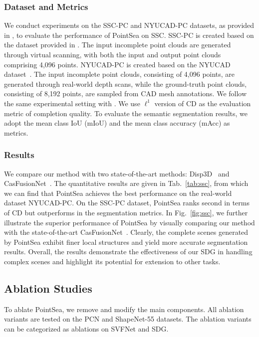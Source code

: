 \subsubsection{Dataset and Metrics}
We conduct experiments on the SSC-PC and NYUCAD-PC datasets, as provided in \cite{xu2023casfusionnet}, to evaluate the performance of PointSea on SSC. SSC-PC is created based on the dataset provided in \cite{zhang2021point}. The input incomplete point clouds are generated through virtual scanning, with both the input and output point clouds comprising 4,096 points. NYUCAD-PC is created based on the NYUCAD dataset~\citep{Firman_2016_CVPR}. The input incomplete point clouds, consisting of 4,096 points, are generated through real-world depth scans, while the ground-truth point clouds, consisting of 8,192 points, are sampled from CAD mesh annotations. We follow the same experimental setting with \cite{xu2023casfusionnet}.
We use $\displaystyle \ell ^{1}$ version of CD as the evaluation metric of completion quality. To evaluate the semantic segmentation results, we adopt the mean class IoU (mIoU) and the mean class accuracy (mAcc) as metrics.
\subsubsection{Results}
We compare our method with two state-of-the-art methods: Disp3D~\citep{wang2022learning} and CasFusionNet~\citep{xu2023casfusionnet}. The quantitative results are given in Tab.~\ref{tab:ssc}, from which we can find that PointSea achieves the best performance on the real-world dataset NYUCAD-PC. On the SSC-PC dataset, PointSea ranks second in terms of CD but outperforms in the segmentation metrics.
In Fig.~\ref{fig:ssc}, we further illustrate the superior performance of PointSea by visually comparing our method with the state-of-the-art CasFusionNet~\citep{xu2023casfusionnet}. Clearly, the complete scenes generated by PointSea exhibit finer local structures and yield more accurate segmentation results.
Overall, the results demonstrate the effectiveness of our SDG in handling complex scenes and highlight its potential for extension to other tasks.

\subsection{Ablation Studies}
\label{ablationSec}
To ablate PointSea, we remove and modify the main components. All ablation variants are tested on the PCN and ShapeNet-55 datasets. The ablation variants can be categorized as ablations on SVFNet and SDG.


